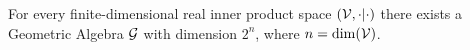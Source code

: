 \begin{definition}\label{t:existence-dimension}
	For every finite-dimensional real inner product space $(\mathcal{V}, \cdot|\cdot)$ there exists a Geometric Algebra $\mathcal{G}$ with dimension $2^n$, where $n = \dim(\mathcal{V})$.
\end{definition}
